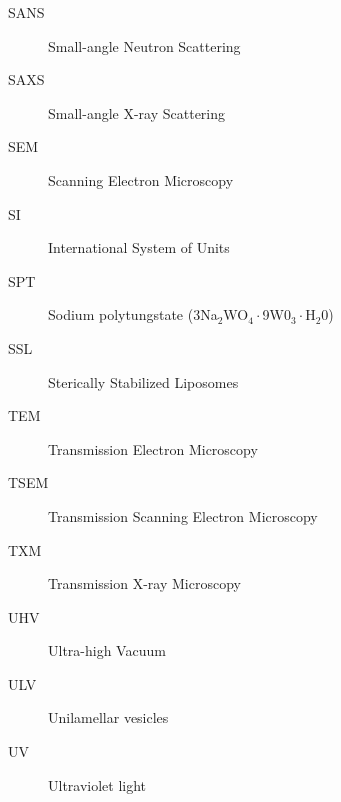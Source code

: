 {\begin{description}
        \item   [SANS] Small-angle Neutron Scattering
        \item   [SAXS] Small-angle X-ray Scattering
        \item   [SEM] Scanning Electron Microscopy
        \item   [SI] International System of Units
        \item   [SPT] Sodium polytungstate (3Na$_2$WO$_4\cdot$9W0$_3\cdot$H$_2$0)
        \item   [SSL] Sterically Stabilized Liposomes
        \item   [TEM] Transmission Electron Microscopy
        \item   [TSEM] Transmission Scanning Electron Microscopy
        \item   [TXM] Transmission X-ray Microscopy  
        \item   [UHV] Ultra-high Vacuum      
        \item   [ULV] Unilamellar vesicles
        \item   [UV] Ultraviolet light

        

\end{description}
}

\cleardoublepage
